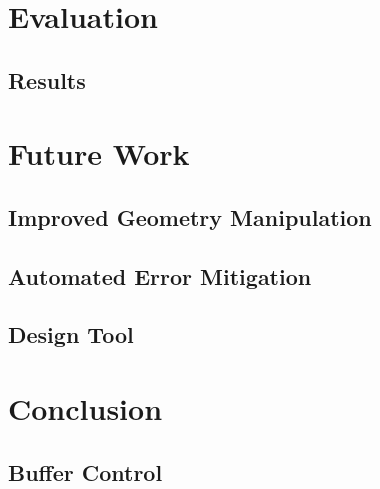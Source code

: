 \documentclass[11pt]{article} %
\begin{document}
\section{Evaluation}
\subsection{Results}




\section{Future Work}
\subsection{Improved Geometry Manipulation}




\subsection{Automated Error Mitigation}




\subsection{Design Tool}




\section{Conclusion}

\subsection{Buffer Control}


\nocite{*}


\end{document}
